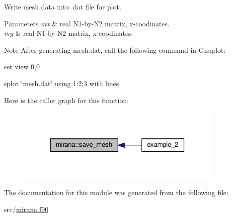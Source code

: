 Write mesh data into .dat file for plot. 


\begin{DoxyParams}{Parameters}
{\em mx} & real N1-\/by-\/\-N2 matrix, x-\/coodinates. \\
\hline
{\em my} & real N1-\/by-\/\-N2 matrix, x-\/coodinates. \\
\hline
\end{DoxyParams}
\begin{DoxyNote}{Note}
After generating mesh.\-dat, call the following command in Gnuplot\-:
\begin{DoxyItemize}
\item set view 0,0
\item splot \char`\"{}mesh.\-dat\char`\"{} using 1\-:2\-:3 with lines 
\end{DoxyItemize}
\end{DoxyNote}


Here is the caller graph for this function\-:\nopagebreak
\begin{figure}[H]
\begin{center}
\leavevmode
\includegraphics[width=282pt]{classmirana_a9cbee1a318e5e828590c9ccaa51c8472_icgraph}
\end{center}
\end{figure}




The documentation for this module was generated from the following file\-:\begin{DoxyCompactItemize}
\item 
src/\hyperlink{mirana_8f90}{mirana.\-f90}\end{DoxyCompactItemize}
